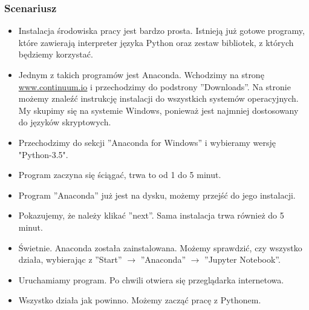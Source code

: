 \documentclass{mwart}
\begin{document}
\subsubsection{Scenariusz}

\begin{itemize}
  \item Instalacja środowiska pracy jest bardzo prosta. Istnieją już gotowe programy,
    które zawierają interpreter języka Python oraz zestaw bibliotek, z których będziemy
    korzystać.
  \item Jednym z takich programów jest Anaconda. Wchodzimy na stronę
    \url{www.continuum.io} i przechodzimy do podstrony ''Downloads''. Na stronie możemy
    znaleźć instrukcję instalacji do wszystkich systemów operacyjnych. My skupimy się
    na systemie Windows, ponieważ jest najmniej dostosowany do języków skryptowych.
  \item Przechodzimy do sekcji ''Anaconda for Windows'' i wybieramy wersję "Python-3.5".
  \item Program zaczyna się ściągać, trwa to od 1 do 5 minut.
  \item Program ''Anaconda'' już jest na dysku, możemy przejść do jego instalacji.
  \item Pokazujemy, że należy klikać ''next''. Sama instalacja trwa również do 5 minut.
  \item Świetnie. Anaconda została zainstalowana. Możemy sprawdzić, czy wszystko działa,
    wybierając z ''Start'' $\rightarrow$ ''Anaconda'' $\rightarrow$ ''Jupyter Notebook''.
  \item Uruchamiamy program. Po chwili otwiera się przeglądarka internetowa.
  \item Wszystko działa jak powinno. Możemy zacząć pracę z Pythonem.
\end{itemize}
\end{document}
